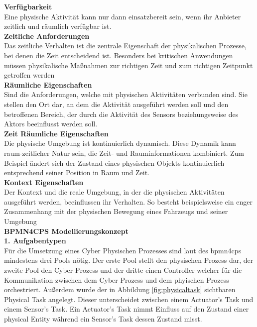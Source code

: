 \documentclass[a4paper, 12pt, twoside, headsepline=true]{scrartcl} %
\begin{document}
\textbf{Verfügbarkeit}\\
Eine physische Aktivität kann nur dann einsatzbereit sein, wenn ihr Anbieter zeitlich und räumlich verfügbar ist.\\

\textbf{Zeitliche Anforderungen}\\
Das zeitliche Verhalten ist die zentrale Eigenschaft der physikalischen Prozesse, bei denen die Zeit entscheidend ist. Besonders bei kritischen Anwendungen müssen physikalische Maßnahmen zur richtigen Zeit und zum richtigen Zeitpunkt getroffen werden\\

\textbf{Räumliche Eigenschaften}\\
Sind die Anforderungen, welche mit physischen Aktivitäten verbunden sind. Sie stellen den Ort dar, an dem die Aktivität ausgeführt werden soll und den betroffenen Bereich, der durch die Aktivität des Sensors beziehungsweise des Aktors beeinflusst werden soll.\\

\textbf{Zeit Räumliche Eigenschaften}\\
Die physische Umgebung ist kontinuierlich dynamisch. Diese Dynamik kann raum-zeitlicher Natur sein, die Zeit- und Rauminformationen kombiniert. Zum Beispiel ändert sich der Zustand eines physischen Objekts kontinuierlich entsprechend seiner Position in Raum und Zeit.\\

\textbf{Kontext Eigenschaften}\\
Der Kontext und die reale Umgebung, in der die physischen Aktivitäten ausgeführt werden, beeinflussen ihr Verhalten. So besteht beispielsweise ein enger Zusammenhang mit der physischen Bewegung eines Fahrzeugs und seiner Umgebung\\

\textbf{BPMN4CPS Modellierungskonzept}\\

\textbf{1. Aufgabentypen}\\
Für die Umsetzung eines Cyber Physischen Prozesses sind laut des \ac{bpmn4cps} mindestens drei Pools nötig. Der erste Pool stellt den physischen Prozess dar, der zweite Pool den Cyber Prozess und der dritte einen Controller welcher für die Kommunikation zwischen dem Cyber Prozess und dem phyischen Prozess orchestriert. Außerdem wurde der in Abbildung \ref{fig:physicaltask} sichtbaren Physical Task  angelegt. Dieser unterscheidet zwischen einem Actuator's Task und einem Sensor's Task. Ein Actuator's Task nimmt Einfluss auf den Zustand einer physical Entity während ein Sensor's Task dessen Zustand misst.
\end{document}
